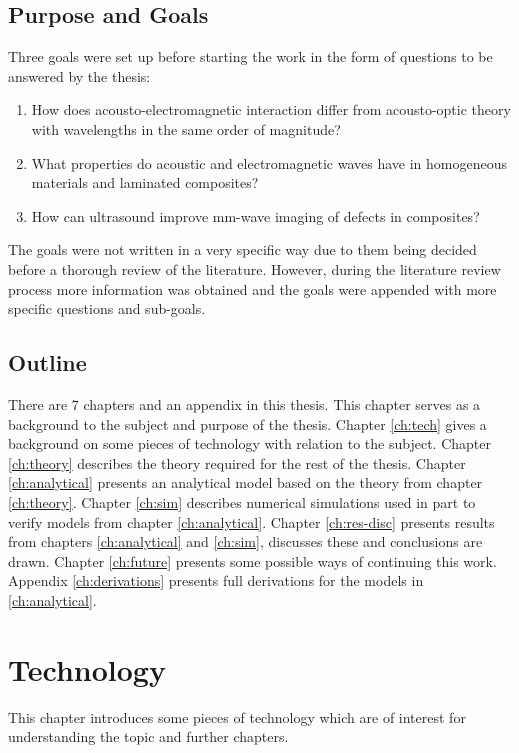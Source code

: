 \documentclass[11pt,twoside]{eitExjobb}
\begin{document}
	\section{Purpose and Goals}
	Three goals were set up before starting the work in the form of questions to be answered by the thesis:
	\begin{enumerate}
		\item How does acousto-electromagnetic interaction differ from acousto-optic theory with wavelengths in the same order of magnitude?
		\item What properties do acoustic and electromagnetic waves have in homogeneous materials and laminated composites?
		\item How can ultrasound improve mm-wave imaging of defects in composites?
	\end{enumerate}
	The goals were not written in a very specific way due to them being decided before a thorough review of the literature. However, during the literature review process more information was obtained and the goals were appended with more specific questions and sub-goals.
	
	\section{Outline}
	There are 7 chapters and an appendix in this thesis. This chapter serves as a background to the subject and purpose of the thesis. Chapter \ref{ch:tech} gives a background on some pieces of technology with relation to the subject. Chapter \ref{ch:theory} describes the theory required for the rest of the thesis. Chapter \ref{ch:analytical} presents an analytical model based on the theory from chapter \ref{ch:theory}. Chapter \ref{ch:sim} describes numerical simulations used in part to verify models from chapter \ref{ch:analytical}. Chapter \ref{ch:res-disc} presents results from chapters \ref{ch:analytical} and \ref{ch:sim}, discusses these and conclusions are drawn. Chapter \ref{ch:future} presents some possible ways of continuing this work. Appendix \ref{ch:derivations} presents full derivations for the models in \ref{ch:analytical}.
	
	\chapter{Technology \label{ch:tech}}
	This chapter introduces some pieces of technology which are of interest for understanding the topic and further chapters.
	
\end{document}
